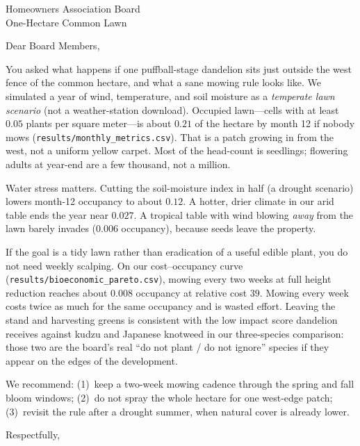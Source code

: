 \documentclass[11pt]{letter}
\begin{document}
\begin{letter}{Homeowners Association Board\\One-Hectare Common Lawn}

\opening{Dear Board Members,}

You asked what happens if one puffball-stage dandelion sits just outside the
west fence of the common hectare, and what a sane mowing rule looks like.
We simulated a year of wind, temperature, and soil moisture as a
\emph{temperate lawn scenario} (not a weather-station download). Occupied
lawn---cells with at least $0.05$ plants per square meter---is about
$0.21$ of the hectare by month 12 if nobody mows
(\texttt{results/monthly\_metrics.csv}). That is a patch growing in from the
west, not a uniform yellow carpet. Most of the head-count is seedlings;
flowering adults at year-end are a few thousand, not a million.

Water stress matters. Cutting the soil-moisture index in half (a drought
scenario) lowers month-12 occupancy to about $0.12$.
A hotter, drier climate in our arid table ends the year near $0.027$.
A tropical table with wind blowing \emph{away} from the lawn barely
invades ($0.006$ occupancy), because seeds leave the property.

If the goal is a tidy lawn rather than eradication of a useful edible plant,
you do not need weekly scalping. On our cost--occupancy curve
(\texttt{results/bioeconomic\_pareto.csv}), mowing every two weeks at full
height reduction reaches about $0.008$ occupancy at relative cost $39$.
Mowing every week costs twice as much for the same occupancy and is wasted
effort. Leaving the stand and harvesting greens is consistent with the
low impact score dandelion receives against kudzu and Japanese knotweed
in our three-species comparison: those two are the board's real ``do not
plant / do not ignore'' species if they appear on the edges of the
development.

We recommend: (1)~keep a two-week mowing cadence through the spring and fall
bloom windows; (2)~do not spray the whole hectare for one west-edge patch;
(3)~revisit the rule after a drought summer, when natural cover is already
lower.

\closing{Respectfully,}
\end{letter}
\end{document}
